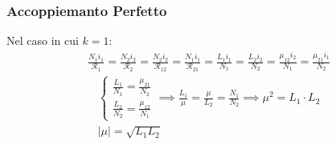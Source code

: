 \documentclass[../main.tex]{subfiles}
\begin{document}
	\subsubsection{Accoppiemanto Perfetto}
	Nel caso in cui $k=1$:
	\begin{gather}
		\frac{N_1i_1}{\mathscr{R}_1} = \frac{N_2i_2}{\mathscr{R}_2} = \frac{N_2i_2}{\mathscr{R}_{12}} = \frac{N_1i_1}{\mathscr{R}_{21}} = \frac{L_1i_1}{N_1}=\frac{L_2i_2}{N_2}=\frac{\mu_{12}i_2}{N_1}=\frac{\mu_{21}i_1}{N_2}
	\end{gather}
	\begin{gather}
		\begin{cases}
			\frac{L_1}{N_1}=\frac{\mu_{21}}{N_2} \\
			\frac{L_2}{N_2}=\frac{\mu_{12}}{N_1}
		\end{cases} \implies \frac{L_1}{\mu}=\frac{\mu}{L_2}=\frac{N_1}{N_2}\implies \mu^2=L_1\cdot L_2 \\
		|\mu|=\sqrt{L_1L_2}
	\end{gather}
\end{document}
